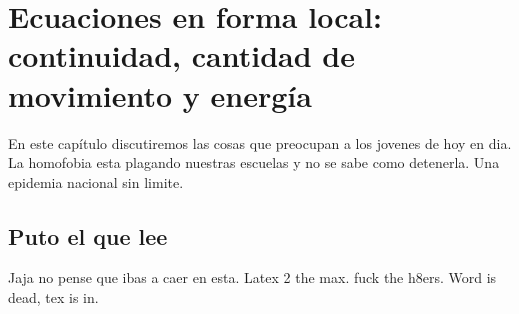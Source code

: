 \chapter[Ecuaciones en forma local]{Ecuaciones en forma local: continuidad, cantidad de movimiento y  energía}
\begin{refsection}
\linespread{1}
\vspace{2cm}

En este capítulo discutiremos las cosas que preocupan a los jovenes de hoy en dia. La homofobia esta plagando nuestras escuelas y no se sabe como detenerla. Una epidemia nacional sin limite.

\section{Puto el que lee}
Jaja no pense que ibas a caer en esta. Latex 2 the max. fuck the h8ers. Word is dead, tex is in.

\end{refsection}



